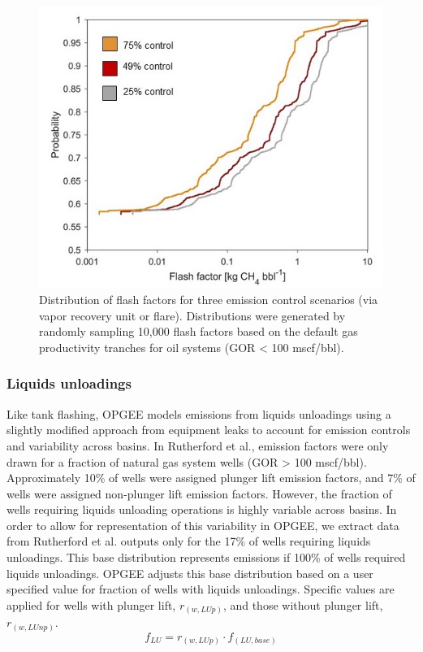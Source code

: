 \documentclass[11pt]{report}
\begin{document}
 \begin{figure}[t]
\includegraphics[width=1\columnwidth]{images/Flash_factors.jpg}
\caption{ Distribution of flash factors for three emission control scenarios (via vapor recovery unit or flare). Distributions were generated by randomly sampling 10,000 flash factors based on the default gas productivity tranches for oil systems (GOR < 100 mscf/bbl). }
\label{fig:Flash_factors}
\end{figure}  

\subsubsection{Liquids unloadings}
Like tank flashing, OPGEE models emissions from liquids unloadings using a slightly modified approach from equipment leaks to account for emission controls and variability across basins. In Rutherford et al., emission factors were only drawn for a fraction of natural gas system wells (GOR > 100 mscf/bbl). Approximately 10\% of wells were assigned plunger lift emission factors, and 7\% of wells were assigned non-plunger lift emission factors. However, the fraction of wells requiring liquids unloading operations is highly variable across basins. In order to allow for representation of this variability in OPGEE, we extract data from Rutherford et al. outputs only for the 17\% of wells requiring liquids unloadings. This base distribution represents emissions if 100\% of wells required liquids unloadings. OPGEE adjusts this base distribution based on a user specified value for fraction of wells with liquids unloadings. Specific values are applied for wells with plunger lift, $r_{(w,LUp)}$, and those without plunger lift, $r_{(w,LUnp)}$.
\begin{equation}
f_{LU}=r_{(w,LUp)}\cdot f_{(LU,base)}
\end{equation}
\end{document}

